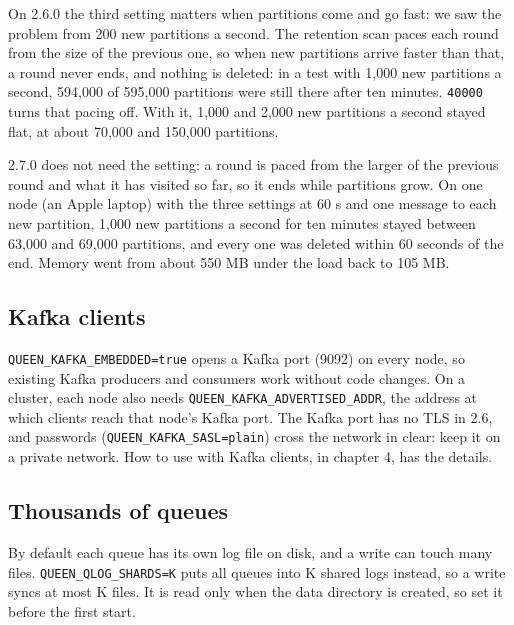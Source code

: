 

On 2.6.0 the third setting matters when partitions come and go fast: we saw the problem from 200
new partitions a second. The retention scan paces each round from the size of the previous one, so
when new partitions arrive faster than that, a round never ends, and nothing is deleted: in a test
with 1,000 new partitions a second, 594,000 of 595,000 partitions were still there after ten
minutes. \texttt{40000} turns that pacing off. With it, 1,000 and 2,000 new partitions a second
stayed flat, at about 70,000 and 150,000 partitions.

2.7.0 does not need the setting: a round is paced from the larger of the previous round and what it
has visited so far, so it ends while partitions grow. On one node (an Apple laptop) with the three
settings at 60 s and one message to each new partition, 1,000 new partitions a second for ten
minutes stayed between 63,000 and 69,000 partitions, and every one was deleted within 60 seconds of
the end. Memory went from about 550 MB under the load back to 105 MB.

\subsection{Kafka clients}

\texttt{QUEEN\_KAFKA\_EMBEDDED=true} opens a Kafka port (9092) on every node, so existing Kafka
producers and consumers work without code changes. On a cluster, each node also needs
\texttt{QUEEN\_KAFKA\_ADVERTISED\_ADDR}, the address at which clients reach that node's Kafka
port. The Kafka port has no TLS in 2.6, and passwords (\texttt{QUEEN\_KAFKA\_SASL=plain}) cross the
network in clear: keep it on a private network. How to use with Kafka clients, in chapter 4, has
the details.

\subsection{Thousands of queues}

By default each queue has its own log file on disk, and a write can touch many files.
\texttt{QUEEN\_QLOG\_SHARDS=K} puts all queues into K shared logs instead, so a write syncs at most
K files. It is read only when the data directory is created, so set it before the first start.

